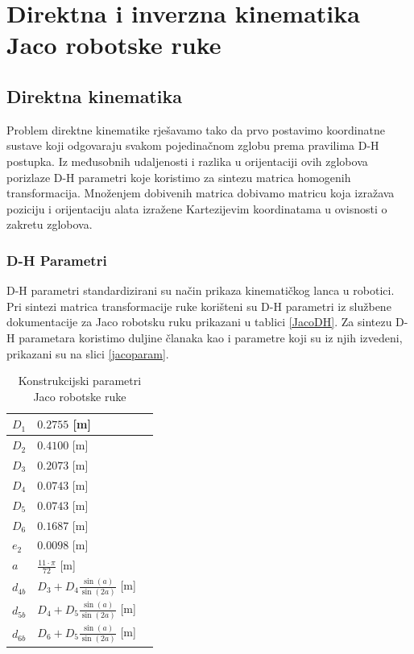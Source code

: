 \documentclass[times, utf8, diplomski, numeric]{fer}
\begin{document}
\section{Direktna i inverzna kinematika Jaco robotske ruke}\label{direkt i inverz}
\subsection{Direktna kinematika}
Problem direktne kinematike rješavamo tako da prvo postavimo koordinatne sustave koji odgovaraju svakom pojedinačnom zglobu prema pravilima D-H postupka.
Iz međusobnih udaljenosti i razlika u orijentaciji ovih zglobova porizlaze D-H parametri koje koristimo za sintezu matrica homogenih transformacija.
Množenjem dobivenih matrica dobivamo matricu koja izražava poziciju i orijentaciju alata izražene Kartezijevim koordinatama u ovisnosti o zakretu zglobova.
 
\subsubsection{D-H Parametri}
D-H parametri standardizirani su način prikaza kinematičkog lanca u robotici.
Pri sintezi matrica transformacije ruke korišteni su D-H parametri iz službene dokumentacije za Jaco robotsku ruku prikazani u tablici \ref{JacoDH}. 
Za sintezu D-H parametara koristimo duljine članaka kao i parametre koji su iz njih izvedeni, prikazani su na slici \ref{jacoparam}.

\begin{table}[h!]
    \centering
    \begin{tabular}{ | l | l | l |}
    \hline
    $D_{1}$ & $0.2755$ [m] \\ \hline
    $D_{2}$  & $0.4100$ [m] \\ \hline
    $D_{3}$  & $0.2073$ [m] \\ \hline
    $D_{4}$  & $0.0743$ [m] \\ \hline
    $D_{5}$  & $0.0743$ [m] \\ \hline
    $D_{6}$  & $0.1687$ [m] \\ \hline
    $e_{2}$  & $0.0098$ [m] \\ \hline
    $a$  & $\frac{11\cdot\pi}{72}$ [m] \\ \hline
    $d_{4b}$  & $D_{3}+D_{4}\frac{\sin(a)}{\sin(2a)}$ [m] \\ \hline
    $d_{5b}$  & $D_{4}+D_{5}\frac{\sin(a)}{\sin(2a)}$ [m] \\ \hline
    $d_{6b}$  & $D_{6}+D_{5}\frac{\sin(a)}{\sin(2a)}$ [m] \\ \hline
    \end{tabular}
    \caption{Konstrukcijski parametri Jaco robotske ruke}
\end{table}
\end{document}
